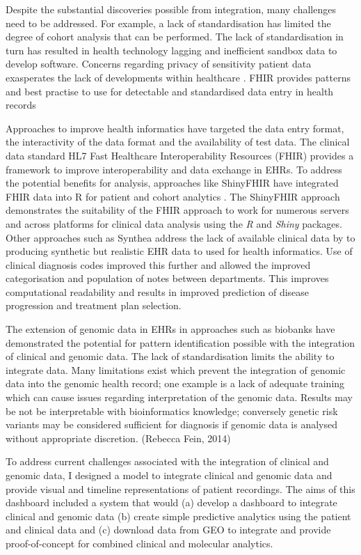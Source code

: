 \documentclass{bioinfo}
\begin{document}
Despite the substantial discoveries possible from integration, many challenges need to be addressed. For example, a lack of standardisation has limited the degree of cohort analysis that can be performed. 
The lack of standardisation in turn has resulted in health technology lagging \citep{Evans2016} and inefficient sandbox data to develop software.
Concerns regarding privacy of sensitivity patient data exasperates the lack of developments within healthcare \cite{Ross2014}. FHIR provides patterns and best practise to use for detectable and standardised data entry in health records \

Approaches to improve health informatics have targeted the data entry format, the interactivity of the data format and the availability of test data. The clinical data standard HL7 Fast Healthcare Interoperability Resources (FHIR) \cite{Hong2017} provides a framework to improve interoperability and data exchange in EHRs.  To address the potential benefits for analysis, approaches like ShinyFHIR have integrated FHIR data into R for patient and cohort analytics \cite{Hong2017}. 
The ShinyFHIR approach demonstrates the suitability of the FHIR approach to work for numerous servers and across platforms for clinical data analysis using the \textit{R} and \textit{Shiny} packages. Other approaches such as Synthea address the lack of available clinical data by to producing synthetic but realistic EHR data to used for health informatics. Use of clinical diagnosis codes improved this further and allowed the improved categorisation and population of notes between departments. This improves computational readability and results in improved prediction of disease progression and treatment plan selection. 

The extension of genomic data in EHRs in approaches such as biobanks have demonstrated the potential for pattern identification possible with the integration of clinical and genomic data. The lack of standardisation limits the ability to integrate data. Many limitations exist which prevent the integration of genomic data into the genomic health record; one example is a lack of adequate training which can cause issues regarding interpretation of the genomic data. Results may be not be interpretable with bioinformatics knowledge; conversely genetic risk variants may be considered sufficient for diagnosis if genomic data is analysed without appropriate discretion. (Rebecca Fein, 2014) 


To address current challenges associated with the integration of clinical and genomic data, I designed a model to integrate clinical and genomic data and provide visual and timeline representations of patient recordings. The aims of this dashboard included a system that would (a) develop a dashboard to integrate clinical and genomic data (b) create simple predictive analytics using the patient and clinical data and (c) download data from GEO to integrate and provide proof-of-concept for combined clinical and molecular analytics. 
\end{document}
